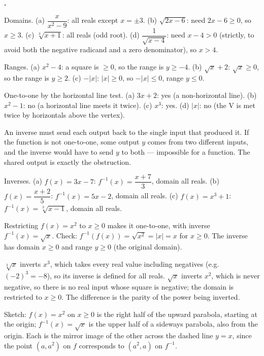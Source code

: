 \documentclass[12pt]{book}
\newcounter{soln}[section]
\newenvironment{solutions}{%
  \setcounter{soln}{0}%
  \begin{list}{\textbf{\arabic{soln}.}}{%
    \usecounter{soln}\setlength{\leftmargin}{2.2em}\setlength{\itemsep}{10pt}}%
}{\end{list}}
\begin{document}
\begin{solutions}
\item Domains. (a) $\dfrac{x}{x^2-9}$: all reals except $x=\pm3$. (b) $\sqrt{2x-6}$:
need $2x-6\ge0$, so $x\ge3$. (c) $\sqrt[3]{x+1}$: all reals (odd root). (d)
$\dfrac{1}{\sqrt{x-4}}$: need $x-4>0$ (strictly, to avoid both the negative radicand
and a zero denominator), so $x>4$.

\item Ranges. (a) $x^2-4$: a square is $\ge0$, so the range is $y\ge-4$. (b)
$\sqrt{x}+2$: $\sqrt{x}\ge0$, so the range is $y\ge2$. (c) $-|x|$: $|x|\ge0$, so
$-|x|\le0$, range $y\le0$.

\item One-to-one by the horizontal line test. (a) $3x+2$: yes (a non-horizontal line).
(b) $x^2-1$: no (a horizontal line meets it twice). (c) $x^3$: yes. (d) $|x|$: no (the
V is met twice by horizontals above the vertex).

\item An inverse must send each output back to the single input that produced it. If
the function is not one-to-one, some output $y$ comes from two different inputs, and
the inverse would have to send $y$ to both — impossible for a function. The shared
output is exactly the obstruction.

\item Inverses. (a) $f(x)=3x-7$: $f^{-1}(x)=\dfrac{x+7}{3}$, domain all reals. (b)
$f(x)=\dfrac{x+2}{5}$: $f^{-1}(x)=5x-2$, domain all reals. (c) $f(x)=x^3+1$:
$f^{-1}(x)=\sqrt[3]{x-1}$, domain all reals.

\item Restricting $f(x)=x^2$ to $x\ge0$ makes it one-to-one, with inverse
$f^{-1}(x)=\sqrt{x}$. Check: $f^{-1}(f(x))=\sqrt{x^2}=|x|=x$ for $x\ge0$. The inverse
has domain $x\ge0$ and range $y\ge0$ (the original domain).

\item $\sqrt[3]{x}$ inverts $x^3$, which takes every real value including negatives
(e.g. $(-2)^3=-8$), so its inverse is defined for all reals. $\sqrt{x}$ inverts $x^2$,
which is never negative, so there is no real input whose square is negative; the domain
is restricted to $x\ge0$. The difference is the parity of the power being inverted.

\item Sketch: $f(x)=x^2$ on $x\ge0$ is the right half of the upward parabola, starting
at the origin; $f^{-1}(x)=\sqrt{x}$ is the upper half of a sideways parabola, also from
the origin. Each is the mirror image of the other across the dashed line $y=x$, since
the point $(a,a^2)$ on $f$ corresponds to $(a^2,a)$ on $f^{-1}$.


\end{solutions}
\end{document}
